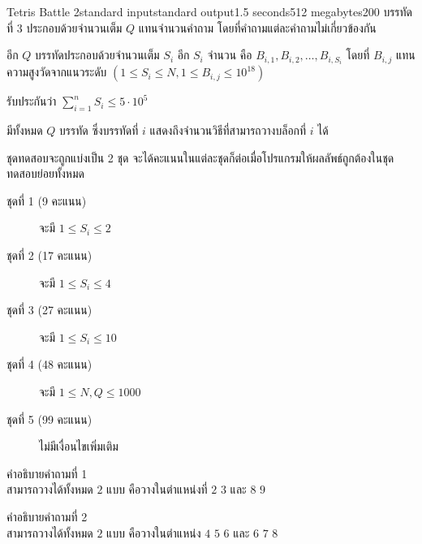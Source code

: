 \documentclass[11pt,a4paper]{article}
\begin{document}
\begin{problem}{Tetris Battle 2}{standard input}{standard output}{1.5 seconds}{512 megabytes}{200}
บรรทัดที่ $3$ ประกอบด้วยจำนวนเต็ม $Q$ แทนจำนวนคำถาม โดยที่คำถามแต่ละคำถามไม่เกี่ยวข้องกัน

อีก $Q$ บรรทัดประกอบด้วยจำนวนเต็ม $S_i$ อีก $S_i$ จำนวน คือ $B_{i,1},B_{i,2},\ldots,B_{i,S_i}$ โดยที่ $B_{i,j}$ แทน ความสูงวัดจากแนวระดับ $(1\leq S_i\leq N,1\leq B_{i,j}\leq 10^{18})$

รับประกันว่า $\sum\limits_{i=1}^nS_i\leq 5\cdot 10^5$

\OutputFile
มีทั้งหมด $Q$ บรรทัด ซึ่งบรรทัดที่ $i$ แสดงถึงจำนวนวิธีที่สามารถวางบล็อกที่ $i$ ได้

\Scoring
ชุดทดสอบจะถูกแบ่งเป็น 2 ชุด จะได้คะแนนในแต่ละชุดก็ต่อเมื่อโปรแกรมให้ผลลัพธ์ถูกต้องในชุดทดสอบย่อยทั้งหมด

\begin{description}

\item[ชุดที่ 1 (9 คะแนน)] จะมี $1\leq S_i\leq 2$
\item[ชุดที่ 2 (17 คะแนน)] จะมี $1\leq S_i\leq 4$
\item[ชุดที่ 3 (27 คะแนน)] จะมี $1\leq S_i\leq 10$
\item[ชุดที่ 4 (48 คะแนน)] จะมี $1\leq N,Q\leq 1000$
\item[ชุดที่ 5 (99 คะแนน)] ไม่มีเงื่อนไขเพิ่มเติม 

\end{description}

\Examples

\begin{example}
%
\end{example}

\Note

คำอธิบายคำถามที่ 1\\
สามารถวางได้ทั้งหมด $2$ แบบ คือวางในตำแหน่งที่ $2$ $3$ และ $8$ $9$

คำอธิบายคำถามที่ 2\\
สามารถวางได้ทั้งหมด $2$ แบบ คือวางในตำแหน่ง $4$ $5$ $6$ และ $6$ $7$ $8$

\end{problem}
\end{document}
